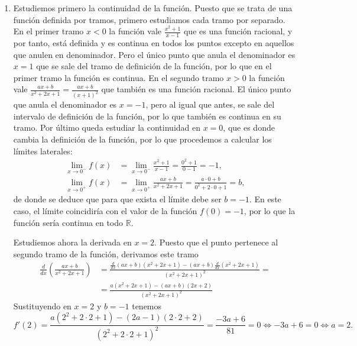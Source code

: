 {\begin{enumerate}
\item Estudiemos primero la continuidad de la función. Puesto que se trata de una función definida por tramos, primero estudiamos cada tramo por separado. En el primer tramo $x< 0$ la función vale $\frac{x^2+1}{x-1}$ que es una función racional, y por tanto,  está definida y es continua en todos los puntos excepto en aquellos que anulen en denominador. Pero el único punto que anula el denominador es $x=1$ que se sale del tramo de definición de la función, por lo que en el primer tramo la función es continua. En el segundo tramo $x>0$ la función vale $\frac{ax + b}
{x^2  + 2x + 1}=\frac{ax+b}{(x+1)^2}$ que también es una función racional. El único punto que anula el denominador es $x=-1$, pero al igual que antes, se sale del intervalo de definición de la función, por lo que también es continua en su tramo. Por último queda estudiar la continuidad en $x=0$, que es donde cambia la definición de la función, por lo que procedemos a calcular los límites laterales:
\begin{align*}
\lim_{x\rightarrow 0^-}f(x)&=\lim_{x\rightarrow 0^-}\frac{x^2+1}{x-1}=\frac{0^2+1}{0-1}=-1,\\
\lim_{x\rightarrow 0^+}f(x)&=\lim_{x\rightarrow 0^+}\frac{ax+b}{x^2+2x+1}=\frac{a\cdot 0+b}{0^2+2\cdot 0+1}=b,
\end{align*}
de donde se deduce que para que exista el límite debe ser $b=-1$. En este caso, el límite coincidiría con el valor de la función $f(0)=-1$, por lo que la función sería continua en todo $\mathbb{R}$.

Estudiemos ahora la derivada en $x=2$. Puesto que el punto pertenece al segundo tramo de la función, derivamos este tramo
\begin{align*}
\frac{d}{dx}\left(\frac{ax+b}{x^2  + 2x + 1}\right) &=\frac{\frac{d}{dx}(ax+b)(x^2+2x+1)-(ax+b)\frac{d}{dx}(x^2+2x+1)}{(x^2+2x+1)^2}=\\
&=\frac{a(x^2+2x+1)-(ax+b)(2x+2)}{(x^2+2x+1)^2}
\end{align*}
Sustituyendo en $x=2$ y $b=-1$ tenemos
\[f'(2)=\frac{a(2^2+2\cdot 2+1)-(2a-1)(2\cdot2+2)}{(2^2+2\cdot2+1)^2}=\frac{-3a+6}{81}=0 \Leftrightarrow -3a+6=0 \Leftrightarrow a=2.\]


\end{enumerate}}
